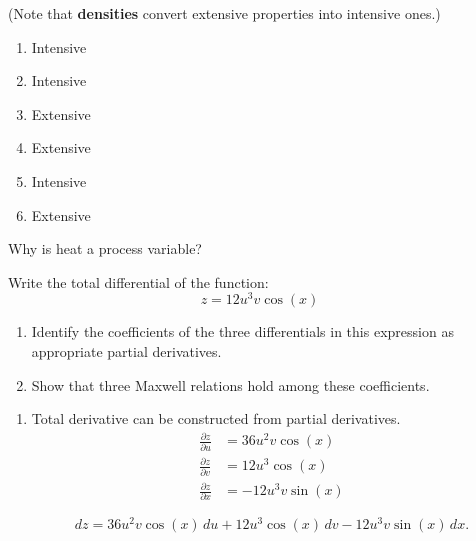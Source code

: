 \begin{@empty}
\begin{answer}
    (Note that \textbf{densities} convert extensive properties into
    intensive ones.)
    \begin{enumerate}
        \item Intensive
        \item Intensive
        \item Extensive
        \item Extensive
        \item Intensive
        \item Extensive
    \end{enumerate}
\end{answer}

\begin{problem}
    Why is heat a process variable?
\end{problem}

\begin{problem}
    Write the total differential of the function:
    \[ z = 12 u^3 v \cos(x) \]

    \begin{enumerate}
        \item Identify the coefficients of the three differentials in this
            expression as appropriate partial derivatives.
        \item Show that three Maxwell relations hold among these coefficients.
    \end{enumerate}
\end{problem}

\begin{answer}
    \begin{enumerate}
        \item Total derivative can be constructed from partial derivatives.
            \begin{align*}
                \frac{\partial z}{\partial u} &= 36 u^2 v \cos(x) \\
                \frac{\partial z}{\partial v} &= 12 u^3 \cos(x) \\
                \frac{\partial z}{\partial x} &= -12 u^3 v \sin(x)
            \end{align*}

            \[ dz = 36 u^2 v \cos(x) \,du
                + 12 u^3 \cos(x) \,dv
                - 12 u^3 v \sin(x) \,dx.\]


\end{enumerate}
\end{answer}
\end{@empty}
